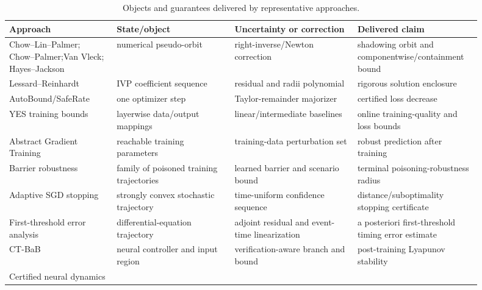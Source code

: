 \documentclass{article}
\begin{document}
\ifdefined\arxivversion
\begin{table}[t]
\caption{Objects and guarantees delivered by representative approaches.}
\label{tab:novelty}
\centering
\footnotesize
\setlength{\tabcolsep}{3.0pt}
\begin{tabular}{>{\raggedright\arraybackslash}p{0.21\linewidth}>{\raggedright\arraybackslash}p{0.23\linewidth}>{\raggedright\arraybackslash}p{0.24\linewidth}>{\raggedright\arraybackslash}p{0.22\linewidth}}
\toprule
Approach & State/object & Uncertainty or correction & Delivered claim \\
\midrule
Chow--Lin--Palmer; Chow--Palmer;\newline Van Vleck; Hayes--Jackson
\citep{chow1989shadowing,chow1992numerical,vanvleck2000componentwise,hayes2003containment}
& numerical pseudo-orbit & right-inverse/Newton correction
& shadowing orbit and componentwise/containment bound \\
Lessard--Reinhardt \citep{lessard2014rigorous}
& IVP coefficient sequence & residual and radii polynomial
& rigorous solution enclosure \\
AutoBound/SafeRate \citep{streeter2022autobound}
& one optimizer step & Taylor-remainder majorizer
& certified loss decrease \\
YES training bounds \citep{yeganegi2024yes}
& layerwise data/output mappings & linear/intermediate baselines
& online training-quality and loss bounds \\
Abstract Gradient Training \citep{sosnin2026agt}
& reachable training parameters & training-data perturbation set
& robust prediction after training \\
Barrier robustness \citep{taheri2026barc}
& family of poisoned training trajectories & learned barrier and scenario bound
& terminal poisoning-robustness radius \\
Adaptive SGD stopping \citep{aolaritei2026stopping}
& strongly convex stochastic trajectory & time-uniform confidence sequence
& distance/suboptimality stopping certificate \\
First-threshold error analysis \citep{chaudhry2021threshold}
& differential-equation trajectory & adjoint residual and event-time linearization
& a posteriori first-threshold timing error estimate \\
CT-BaB \citep{shi2026ctbab}
& neural controller and input region & verification-aware branch and bound
& post-training Lyapunov stability \\
Certified neural dynamics \citep{wicker2021iterative,mathiesen2026certified}

\end{tabular}
\end{table}
\end{document}

